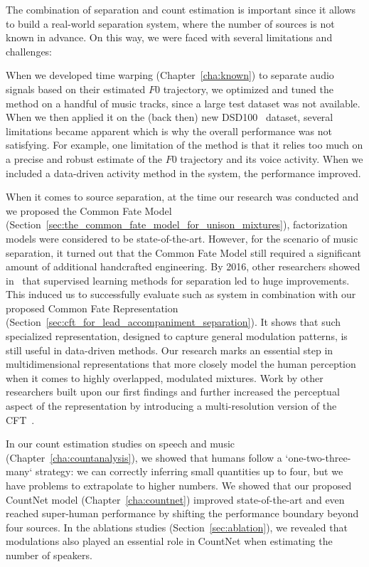 The combination of separation and count estimation is important since it allows to build a real-world separation system, where the number of sources is not known in advance.
On this way, we were faced with several limitations and challenges:
\par
When we developed time warping (Chapter~\ref{cha:known}) to separate audio signals based on their estimated \(F0\) trajectory, we optimized and tuned the method on a handful of music tracks, since a large test dataset was not available. When we then applied it on the (back then) new DSD100~\cite{liutkus17} dataset, several limitations became apparent which is why the overall performance was not satisfying. For example, one limitation of the method is that it relies too much on a precise and robust estimate of the \(F0\) trajectory and its voice activity. When we included a data-driven activity method in the system, the performance improved.
\par
When it comes to source separation, at the time our research was conducted and we proposed the Common Fate Model (Section~\ref{sec:the_common_fate_model_for_unison_mixtures}), factorization models were considered to be state-of-the-art.
However, for the scenario of music separation, it turned out that the Common Fate Model still required a significant amount of additional handcrafted engineering.
By 2016, other researchers showed in~\cite{uhlich15, nugraha162} that supervised learning methods for separation led to huge improvements. This induced us to successfully evaluate such as system in combination with our proposed Common Fate Representation (Section~\ref{sec:cft_for_lead_accompaniment_separation}).
It shows that such specialized representation, designed to capture general modulation patterns, is still useful in data-driven methods.
Our research marks an essential step in multidimensional representations that more closely model the human perception when it comes to highly overlapped, modulated mixtures. Work by other researchers built upon our first findings and further increased the perceptual aspect of the representation by introducing a multi-resolution version of the CFT~\cite{seetharaman17, pishdadian18}.
\par
In our count estimation studies on speech and music (Chapter~\ref{cha:countanalysis}), we showed that humans follow a `one-two-three-many` strategy: we can correctly inferring small quantities up to four, but we have problems to extrapolate to higher numbers.
We showed that our proposed CountNet model (Chapter~\ref{cha:countnet}) improved state-of-the-art and even reached super-human performance by shifting the performance boundary beyond four sources. In the ablations studies (Section~\ref{sec:ablation}), we revealed that modulations also played an essential role in CountNet when estimating the number of speakers.
